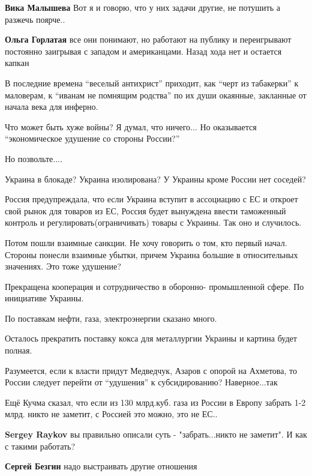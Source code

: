 \begin{itemize}
\begin{itemize}
\textbf{Вика Малышева} Вот я и говорю, что у них задачи другие, не потушить а разжечь поярче..

\textbf{Ольга Горлатая} все они понимают, но работают на публику и переигрывают постоянно заигрывая с западом и американцами. Назад хода нет и остается капкан
\end{itemize} %


В последние времена \enquote{веселый антихрист} приходит, как \enquote{черт из табакерки} к
маловерам, к \enquote{иванам не помнящим родства} по их души окаянные, закланные от
начала века для инферно.


Что может быть хуже войны? Я думал, что ничего... Но оказывается
\enquote{экономическое удушение со стороны России?}

Но позвольте....

Украина в блокаде? Украина изолирована? У Украины кроме России нет соседей?

Россия предупреждала, что если Украина вступит в ассоциацию с ЕС и откроет свой
рынок для товаров из ЕС, Россия будет вынуждена ввести таможенный контроль и
регулировать(ограничивать) товары с Украины. Так оно и случилось.

Потом пошли взаимные санкции. Не хочу говорить о том, кто первый начал. Стороны
понесли взаимные убытки, причем Украина большие в относительных значениях. Это
тоже удушение?

Прекращена кооперация и сотрудничество в оборонно- промышленной сфере. По
инициативе Украины.

По поставкам нефти, газа, электроэнергии сказано много.

Осталось прекратить поставку кокса для металлургии Украины и картина будет
полная.

Разумеется, если к власти придут Медведчук, Азаров с опорой на Ахметова, то
России следует перейти от \enquote{удушения} к субсидированию? Наверное...так

Ещё Кучма сказал, что если из 130 млрд.куб. газа из России в Европу забрать 1-2
млрд. никто не заметит, с Россией это можно, это не ЕС..

\begin{itemize} %
\textbf{Sergey Raykov} вы правильно описали суть - "забрать...никто не заметит". И как с такими работать?

\textbf{Сергей Безгин} надо выстраивать другие отношения


\end{itemize}
\end{itemize}
